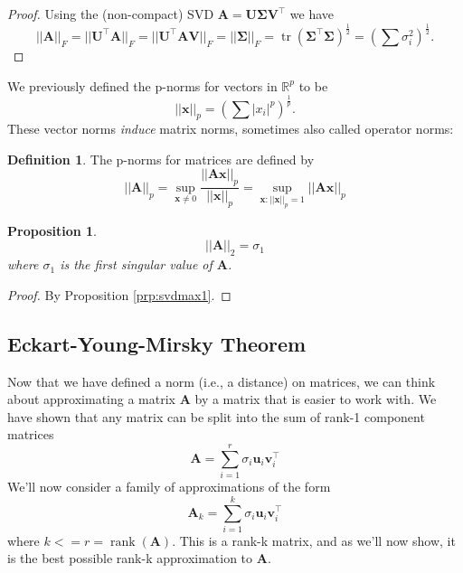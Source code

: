 \documentclass[]{book}
\newtheorem{proposition}{Proposition}[chapter]
\theoremstyle{definition}
\newtheorem{definition}{Definition}[chapter]
\theoremstyle{definition}
\theoremstyle{definition}
\theoremstyle{remark}
\begin{document}
\begin{proof}
{}Using the (non-compact) SVD
\(\mathbf A= \mathbf U\boldsymbol{\Sigma}\mathbf V^\top\)
we have \[||\mathbf A||_F=||\mathbf U^\top \mathbf A||_F = ||\mathbf U^\top \mathbf A\mathbf V||_F = ||\boldsymbol{\Sigma}||_F=\operatorname{tr}(\boldsymbol{\Sigma}^\top\boldsymbol{\Sigma})^\frac{1}{2}=\left(\sum \sigma_i^2 \right)^\frac{1}{2}.\]
\end{proof}

We previously defined the p-norms for vectors in \(\mathbb{R}^p\) to be
\[||\mathbf x||_p = \left(\sum |x_i|^p\right)^{\frac{1}{p}}.\]
These vector norms \emph{induce} matrix norms, sometimes also called operator norms:
\begin{definition}
\protect\hypertarget{def:matrixnorm}{}{\label{def:matrixnorm} }The p-norms for matrices are defined by
\[||\mathbf A||_p = \sup_{\mathbf x\not=0} \frac{||\mathbf A\mathbf x||_p}{||\mathbf x||_p} = \sup_{\mathbf x: ||\mathbf x||_p=1} ||\mathbf A\mathbf x||_p\]
\end{definition}

\begin{proposition}
\protect\hypertarget{prp:L2matrixnorm}{}{\label{prp:L2matrixnorm} }\[||\mathbf A||_2 = \sigma_1\]
where \(\sigma_1\) is the first singular value of \(\mathbf A\).
\end{proposition}
\begin{proof}
{}By Proposition \ref{prp:svdmax1}.
\end{proof}

\hypertarget{eckart-young-mirsky-theorem}{%
\subsection{Eckart-Young-Mirsky Theorem}\label{eckart-young-mirsky-theorem}}

Now that we have defined a norm (i.e., a distance) on matrices, we can think about approximating a matrix \(\mathbf A\) by a matrix that is easier to work with. We have shown that any matrix can be split into the sum of rank-1 component matrices
\[\mathbf A= \sum_{i=1}^r \sigma_i \mathbf u_i \mathbf v_i^\top\]
We'll now consider a family of approximations of the form
\begin{equation}
\mathbf A_k = \sum_{i=1}^k \sigma_i \mathbf u_i \mathbf v_i^\top
\label{eq:svdreduced}
\end{equation}
where \(k<=r=\operatorname{rank}(\mathbf A)\). This is a rank-k matrix, and as we'll now show, it is the best possible rank-k approximation to \(\mathbf A\).
\end{document}
